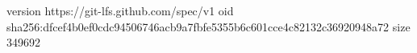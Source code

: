 version https://git-lfs.github.com/spec/v1
oid sha256:dfcef4b0ef0cdc94506746acb9a7fbfe5355b6c601cce4c82132c36920948a72
size 349692

